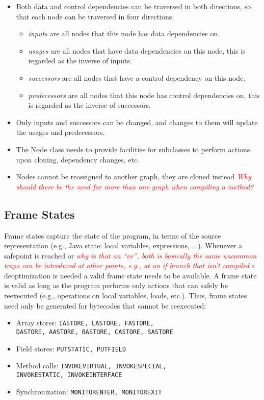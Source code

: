 \documentclass[twocolumn]{svjour3}
\newcommand{\mynote}[2]{
\textcolor{red}{\fbox{\bfseries\sffamily\scriptsize#1}
  {\small\textsf{\emph{#2}}}
\fbox{\bfseries\sffamily\scriptsize }}}
\newcommand\cw[1]{\mynote{CW}{#1}}
\newcommand\ls[1]{\mynote{LS}{#1}}
\begin{document}
\begin{itemize}
    \item Both data and control dependencies can be traversed in both directions, so that each node can be traversed in four directions:
    \begin{itemize}
        \item \emph{inputs} are all nodes that this node has data dependencies on.
        \item \emph{usages} are all nodes that have data dependencies on this node, this is regarded as the inverse of inputs.
        \item \emph{successors} are all nodes that have a control dependency on this node.
        \item \emph{predecessors} are all nodes that this node has control dependencies on, this is regarded as the inverse of successors.
    \end{itemize}
    \item Only inputs and successors can be changed, and changes to them will update the usages and predecessors.
    \item The Node class needs to provide facilities for subclasses to perform actions upon cloning, dependency changes, etc.
    \item Nodes cannot be reassigned to another graph, they are cloned instead \cw{Why should there be the need for more than one graph when compiling a method?}
\end{itemize}

\subsection{Frame States}
Frame states capture the state of the program, in terms of the source representation (e.g., Java state: local variables, expressions, ...).
Whenever a safepoint is reached or \cw{why is that an ``or'', both is basically the same} \ls{uncommon traps can be introduced at other points, e.g., at an if branch that isn't compiled} a deoptimization is needed a valid frame state needs to be available.
A frame state is valid as long as the program performs only actions that can safely be reexecuted (e.g., operations on local variables, loads, etc.).
Thus, frame states need only be generated for bytecodes that cannot be reexecuted:

\begin{itemize}
    \item Array stores: {\tt IASTORE, LASTORE, FASTORE, \\DASTORE, AASTORE, BASTORE, CASTORE, SASTORE}
    \item Field stores: {\tt PUTSTATIC, PUTFIELD}
    \item Method calls: {\tt INVOKEVIRTUAL, INVOKESPECIAL, \\INVOKESTATIC, INVOKEINTERFACE}
    \item Synchronization: {\tt MONITORENTER, MONITOREXIT}
\end{itemize}
\end{document}
